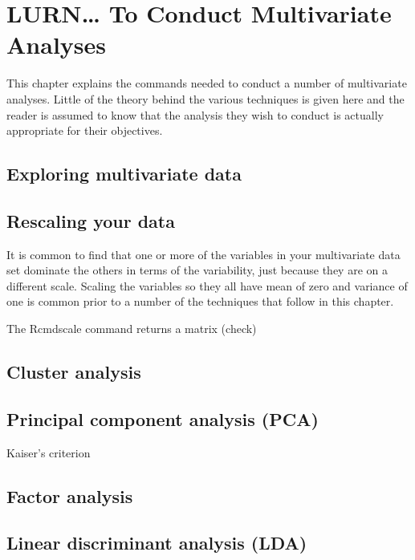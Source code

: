 \chapter{LURN\ldots{} To Conduct Multivariate Analyses} 
\label{Multivariate} 
 

 
This chapter explains the commands needed to conduct a number of multivariate analyses. Little of the theory behind the various techniques is given here and the reader is assumed to know that the analysis they wish to conduct is actually appropriate for their objectives. 
 
\section{Exploring multivariate data} 
 
 
\section{} 
 
 
\section{Rescaling your data} 
 
It is common to find that one or more of the variables in your multivariate data set dominate the others in terms of the variability, just because they are on a different scale. Scaling the variables so they all have mean of zero and variance of one is common prior to a number of the techniques that follow in this chapter. 
 
The Rcmd{scale} command returns a matrix (check)  
 
\section{Cluster analysis} 
 
\section{Principal component analysis (PCA)} 
 
Kaiser's criterion 
 
\section{Factor analysis} 
 
\section{Linear discriminant analysis (LDA)} 
 
